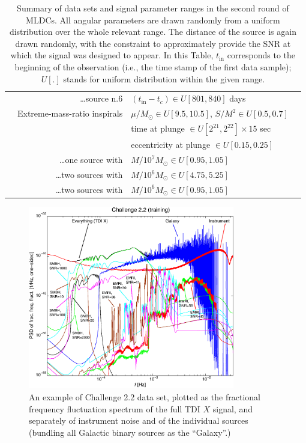 \documentclass[12pt]{iopart}
\begin{document}
\begin{table}
\begin{tabular}{llll}
&\multicolumn{1}{r}{\ldots source n.6} &  $(t_\mathrm{in} - t_c) \in U[801,840]$ days\\
&Extreme-mass-ratio inspirals & $\mu/M_\odot \in U[9.5,10.5]$, $S/M^2 \in U[0.5, 0.7]$ \\
&                                             & time at plunge $\in  U[2^{21},2^{22}] \times 15$ sec \\
&                                             & eccentricity at plunge $\in U[0.15, 0.25]$ \\
&\multicolumn{1}{r}{\ldots one source with}          & $M / 10^7 M_\odot \in U[0.95,1.05]$ \\
&\multicolumn{1}{r}{\ldots two sources with}         & $M / 10^6 M_\odot \in U[4.75,5.25]$ \\
&\multicolumn{1}{r}{\ldots two sources with}         & $M / 10^6 M_\odot \in U[0.95,1.05]$ \\
\hline
\end{tabular}
\caption{Summary of data sets and signal parameter ranges in the second round of MLDCs. All angular parameters are drawn randomly from a uniform distribution over the whole relevant range. The distance of the source is again drawn randomly, with the constraint to approximately provide the SNR at which the signal was designed to appear. In this Table, $t_\mathrm{in}$ corresponds to the beginning of the observation (i.e., the time stamp of the first data sample); $U[.]$ stands for uniform distribution within the given range.}
\label{t:MLDC2}
\end{table}

\begin{figure}[htb]

\centerline{\includegraphics[height=8cm]{challenge-2}}
\caption{\protect\footnotesize
An example of Challenge 2.2 data set, plotted as the fractional frequency fluctuation spectrum of the full TDI $X$ signal, and separately of instrument noise and of the individual sources (bundling all Galactic binary sources as the ``Galaxy''.)}
\label{f:C2.2}
\end{figure}
\end{document}
